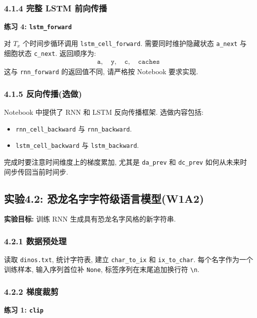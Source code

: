 \documentclass{../../nndlcourse}
\begin{document}
\subsubsection*{4.1.4 完整 LSTM 前向传播}

\textbf{练习 4: \texttt{lstm\_forward}}

对 $T_x$ 个时间步循环调用 \texttt{lstm\_cell\_forward}. 需要同时维护隐藏状态 \texttt{a\_next} 与细胞状态 \texttt{c\_next}. 返回顺序为:
\begin{align}
    \texttt{a},\quad \texttt{y},\quad \texttt{c},\quad \texttt{caches}
\end{align}
这与 \texttt{rnn\_forward} 的返回值不同, 请严格按 Notebook 要求实现.

\subsubsection*{4.1.5 反向传播(选做)}

Notebook 中提供了 RNN 和 LSTM 反向传播框架. 选做内容包括:
\begin{itemize}
    \item \texttt{rnn\_cell\_backward} 与 \texttt{rnn\_backward}.
    \item \texttt{lstm\_cell\_backward} 与 \texttt{lstm\_backward}.
\end{itemize}
完成时要注意时间维度上的梯度累加, 尤其是 \texttt{da\_prev} 和 \texttt{dc\_prev} 如何从未来时间步传回当前时间步.

\subsection*{实验4.2: 恐龙名字字符级语言模型(W1A2)}

\textbf{实验目标: }训练 RNN 生成具有恐龙名字风格的新字符串.

\subsubsection*{4.2.1 数据预处理}

读取 \texttt{dinos.txt}, 统计字符表, 建立 \texttt{char\_to\_ix} 和 \texttt{ix\_to\_char}. 每个名字作为一个训练样本, 输入序列首位补 \texttt{None}, 标签序列在末尾追加换行符 \texttt{\textbackslash n}.

\subsubsection*{4.2.2 梯度裁剪}

\textbf{练习 1: \texttt{clip}}
\end{document}
